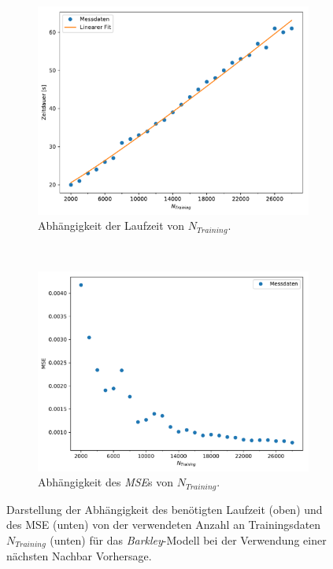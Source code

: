\begin{figure}[H]
	\centering
	\begin{subfigure}{.95\textwidth}
		\centering
		\hspace*{0.3cm}
		\includegraphics[width=.76\textwidth]{figures/results/cross_prediction/nn_trainlength_uv_time.pdf}
		\caption{Abhängigkeit der Laufzeit von $N_{Training}$.}
	\end{subfigure}%
	\\
	\begin{subfigure}{.95\textwidth}
		\centering
		\includegraphics[width=.80\textwidth]{figures/results/cross_prediction/nn_trainlength_uv_mse.pdf}
		\caption{Abhängigkeit des \textit{MSE}s von $N_{Training}$.}
	\end{subfigure}%
	\caption{Darstellung der Abhängigkeit des benötigten Laufzeit (oben) und des MSE (unten) von der verwendeten Anzahl an Trainingsdaten $N_{Training}$ (unten) für das \textit{Barkley}-Modell bei der Verwendung einer nächsten Nachbar Vorhersage.}
	\label{fig:exp_cross_nn_trainlength_mse_time_barkley}
\end{figure}


